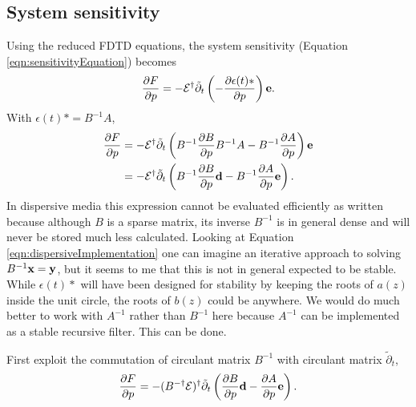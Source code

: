 \subsection{System sensitivity}

Using the reduced FDTD equations, the system sensitivity (Equation \ref{eqn:sensitivityEquation}) becomes
%
\begin{equation}
\frac{\partial{F}}{\partial{p}} = -\mathcal{E}^\dagger \tilde{\partial}_t \left( -\frac{\partial{\epsilon(t) \ast}}{\partial{p}} \right) \textbf{e}.
\end{equation}
%
With $\epsilon(t) \ast = B^{-1} A$,
%
\begin{equation}
\begin{aligned}
\frac{\partial{F}}{\partial{p}} &= -\mathcal{E}^\dagger \tilde{\partial}_t \left( B^{-1}\frac{\partial{B}}{\partial{p}}B^{-1}A - B^{-1} \frac{\partial{A}}{\partial{p}} \right) \textbf{e} \\
&= -\mathcal{E}^\dagger \tilde{\partial}_t \left( B^{-1}\frac{\partial{B}}{\partial{p}} \textbf{d} - B^{-1} \frac{\partial{A}}{\partial{p}} \textbf{e} \right). \\
\end{aligned}
\end{equation}
%
In dispersive media this expression cannot be evaluated efficiently as written because although $B$ is a sparse matrix, its inverse $B^{-1}$ is in general dense and will never be stored much less calculated.  Looking at Equation \ref{eqn:dispersiveImplementation} one can imagine an iterative approach to solving $B^{-1} \textbf{x} = \textbf{y}$, but it seems to me that this is not in general expected to be stable.  While $\epsilon(t) \ast$ will have been designed for stability by keeping the roots of $a(z)$ inside the unit circle, the roots of $b(z)$ could be anywhere.  We would do much better to work with $A^{-1}$ rather than $B^{-1}$ here because $A^{-1}$ can be implemented as a stable recursive filter.  This can be done.

First exploit the commutation of circulant matrix $B^{-1}$ with circulant matrix $\tilde{\partial}_t$,
%
\begin{equation}
\frac{\partial{F}}{\partial{p}} = -(B^{-\dagger} \mathcal{E})^\dagger \tilde{\partial}_t \left(\frac{\partial{B}}{\partial{p}} \textbf{d} - \frac{\partial{A}}{\partial{p}} \textbf{e} \right).
\end{equation}

